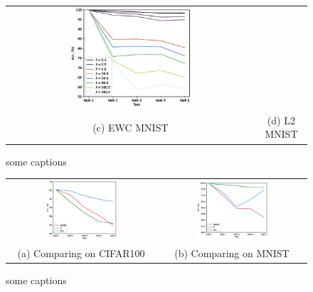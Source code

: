 \documentclass[final]{cvpr}
\begin{document}
\begin{figure}[t]
\begin{tabular}{c@{\hskip0.5cm}c}
        \includegraphics[width=0.5\textwidth]{resources/l2_MNIST.eps}\\%
		(c) EWC MNIST  & (d) L2 MNIST \\
	\end{tabular}\vspace{0.2cm}
	\caption{some captions}
	\label{fig:tsne}
\end{figure}

\begin{figure}[t]
	\begin{tabular}{c@{\hskip0.5cm}c}
		\includegraphics[width=0.5\textwidth]{resources/comp_CIFAR.eps}&%
        \includegraphics[width=0.5\textwidth]{resources/comp_MNIST.eps}\\%
        (a) Comparing on CIFAR100 & (b) Comparing on MNIST\\
	\end{tabular}\vspace{0.2cm}
	\caption{some captions}
	\label{fig:tsne}
\end{figure}



{\small
	
	
}
\end{document}
